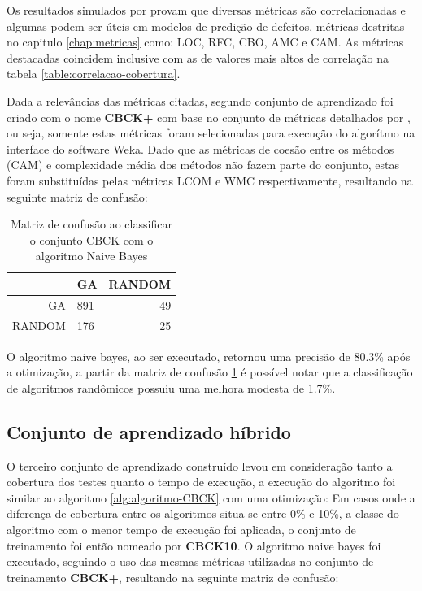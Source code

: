 \documentclass[
	12pt,				%
	oneside,			%
	a4paper,			%
	english,			%
	brazil				%
	]{abntex2ppgsi}
\begin{document}
Os resultados simulados por \cite{Xia2013} provam que diversas métricas são correlacionadas e algumas podem ser úteis em modelos de predição de defeitos, métricas destritas no capitulo \ref{chap:metricas}  como: LOC, RFC, CBO, AMC e CAM.  As métricas destacadas coincidem inclusive com as de valores mais altos de correlação na tabela \ref{table:correlacao-cobertura}.

Dada a relevâncias das métricas citadas, segundo conjunto de aprendizado foi criado com o nome \textbf{CBCK+} com base no conjunto de métricas detalhados por \cite{Xia2013}, ou seja, somente estas métricas foram selecionadas para execução do algorítmo na interface do software Weka. Dado que as métricas de coesão entre os métodos (CAM) e complexidade média dos métodos não fazem parte do conjunto, estas foram substituídas pelas métricas LCOM e WMC respectivamente, resultando na seguinte matriz de confusão:

\begin{table}[h]
\centering
\caption{Matriz de confusão ao classificar o conjunto CBCK com o algoritmo Naive Bayes}
\vspace{0.5cm}
\begin{tabular}{r|lr}

										
 & GA & RANDOM \\ %
\hline                               %
GA		& 891		& 49 \\
RANDOM		& 176		& 25
\end{tabular}
\label{table:confusao-CBCK+}
\end{table}

O algoritmo naive bayes, ao ser executado, retornou uma precisão de 80.3\% após a otimização, a partir da matriz de confusão \ref{table:confusao-CBCK+} é possível notar que a classificação de algoritmos randômicos possuiu uma melhora modesta de 1.7\%. 

\subsection{Conjunto de aprendizado híbrido}

O terceiro conjunto de aprendizado construído levou em consideração tanto a cobertura dos testes quanto o tempo de execução, a execução do algoritmo foi similar ao algoritmo \ref{alg:algoritmo-CBCK} com uma otimização: Em casos onde a diferença de cobertura entre os algoritmos situa-se entre 0\% e 10\%, a classe do algoritmo com o menor tempo de execução foi aplicada, o conjunto de treinamento foi então nomeado por \textbf{CBCK10}. O algoritmo naive bayes foi executado, seguindo o uso das mesmas métricas utilizadas no conjunto de treinamento \textbf{CBCK+}, resultando na seguinte matriz de confusão:
\end{document}
